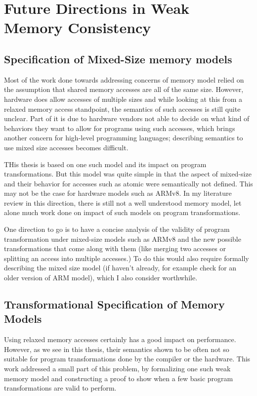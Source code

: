 \section{Future Directions in Weak Memory Consistency}

    \subsection{Specification of Mixed-Size memory models}

        Most of the work done towards addressing concerns of memory model relied on the assumption that shared memory accesses are all of the same size. However, hardware does allow accesses of multiple sizes and while looking at this from a relaxed memory access standpoint, the semantics of such accesses is still quite unclear. Part of it is due to hardware vendors not able to decide on what kind of behaviors they want to allow for programs using such accesses, which brings another concern for high-level programming languages; describing semantics to use mixed size accesses becomes difficult. 

        THis thesis is based on one such model and its impact on program transformations. But this model was quite simple in that the aspect of mixed-size and their behavior for accesses such as atomic were semantically not defined. This may not be the case for hardware models such as ARMv8. In my literature review in this direction, there is still not a well understood memory model, let alone much work done on impact of such models on program transformations. 

        One direction to go is to have a concise analysis of the validity of program transformation under mixed-size models such as ARMv8 and the new possible transformations that come along with them (like merging two accesses or splitting an access into multiple accesses.) To do this would also require formally describing the mixed size model (if haven't already, for example check \cite{Flur} for an older version of ARM model), which I also consider worthwhile.  

    \subsection{Transformational Specification of Memory Models}

        Using relaxed memory accesses certainly has a good impact on performance. However, as we see in this thesis, their semantics shown to be often not so suitable for program transformations done by the compiler or the hardware. This work addressed a small part of this problem, by formalizing one such weak memory model and constructing a proof to show when a few basic program transformations are valid to perform. 

